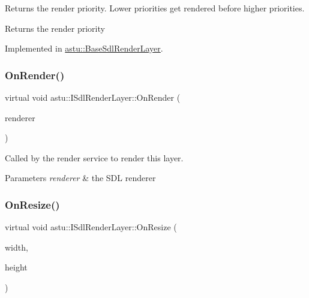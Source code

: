 Returns the render priority. Lower priorities get rendered before higher priorities.

\begin{DoxyReturn}{Returns}
the render priority 
\end{DoxyReturn}


Implemented in \hyperlink{classastu_1_1BaseSdlRenderLayer_a612a7ecc518ea150bbed605a6aa19602}{astu\+::\+Base\+Sdl\+Render\+Layer}.

\mbox{\label{classastu_1_1ISdlRenderLayer_a18af53e17e7f6f945817ad3e8b8ecc87}} 
\subsubsection{\texorpdfstring{On\+Render()}{OnRender()}}
{\footnotesize\ttfamily virtual void astu\+::\+I\+Sdl\+Render\+Layer\+::\+On\+Render (\begin{DoxyParamCaption}\item[{S\+D\+L\+\_\+\+Renderer $\ast$}]{renderer }\end{DoxyParamCaption})\hspace{0.3cm}{\ttfamily [pure virtual]}}

Called by the render service to render this layer.


\begin{DoxyParams}{Parameters}
{\em renderer} & the S\+DL renderer \\
\hline
\end{DoxyParams}
\mbox{\label{classastu_1_1ISdlRenderLayer_abcded808a2405e1e59413b5d1f981f13}} 
\subsubsection{\texorpdfstring{On\+Resize()}{OnResize()}}
{\footnotesize\ttfamily virtual void astu\+::\+I\+Sdl\+Render\+Layer\+::\+On\+Resize (\begin{DoxyParamCaption}\item[{int}]{width,  }\item[{int}]{height }\end{DoxyParamCaption})\hspace{0.3cm}{\ttfamily [pure virtual]}}

